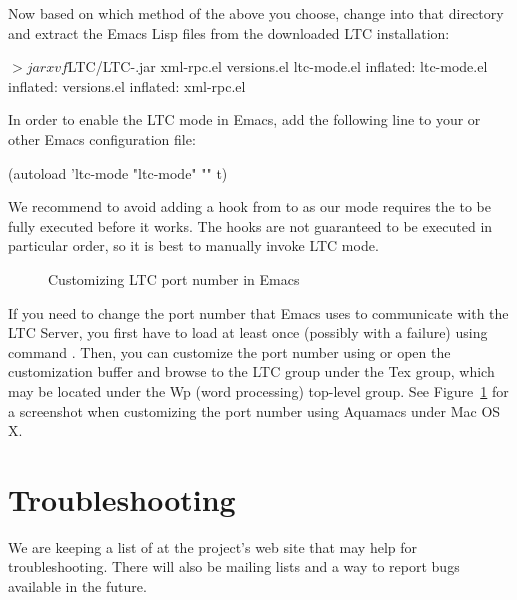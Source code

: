 Now based on which method of the above you choose, change into that directory and extract the Emacs Lisp files from the downloaded LTC installation:
\begin{CodeVerbatim}[commandchars=\\\{\}]
$> jar xvf $LTC/LTC-\version.jar xml-rpc.el versions.el ltc-mode.el
 inflated: ltc-mode.el
 inflated: versions.el
 inflated: xml-rpc.el
\end{CodeVerbatim}

In order to enable the LTC mode in Emacs, add the following line to your  or other Emacs configuration file:

\begin{CodeVerbatim}
(autoload 'ltc-mode "ltc-mode" "" t)
\end{CodeVerbatim}

We recommend to avoid adding a hook from  to  as our mode requires the  to be fully executed before it works. The hooks are not guaranteed to be executed in particular order, so it is best to manually invoke LTC mode.

\begin{figure}[t]
\centering
{}
\caption{Customizing LTC port number in Emacs} \label{fig:emacs-port}
\end{figure}

If you need to change the port number that Emacs uses to communicate with the LTC Server, you first have to load  at least once (possibly with a failure) using command .  Then, you can customize the port number using  or open the customization buffer and browse to the LTC group under the Tex group, which may be located under the Wp (word processing) top-level group.  See Figure~\ref{fig:emacs-port} for a screenshot when customizing the port number using Aquamacs under Mac OS X.

\section{Troubleshooting}

We are keeping a list of  at the project's web site that may help for troubleshooting.  There will also be mailing lists and a way to report bugs available in the future.
